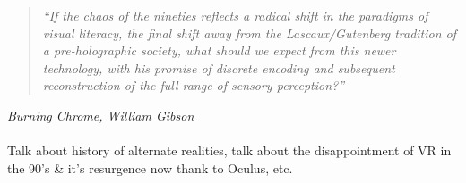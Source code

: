 \begin{quote}
	\textit{``If the chaos of the nineties reflects a radical shift in the paradigms of visual literacy, the final shift away from the Lascaux/Gutenberg tradition of a pre-holographic society, what should we expect from this newer technology, with his promise of discrete encoding and subsequent reconstruction of the full range of sensory perception?''}
\end{quote}
\hfill \textit{Burning Chrome, William Gibson}
\\
\\



Talk about history of alternate realities, talk about the disappointment of VR in the 90's \& it's resurgence now thank to Oculus, etc.
